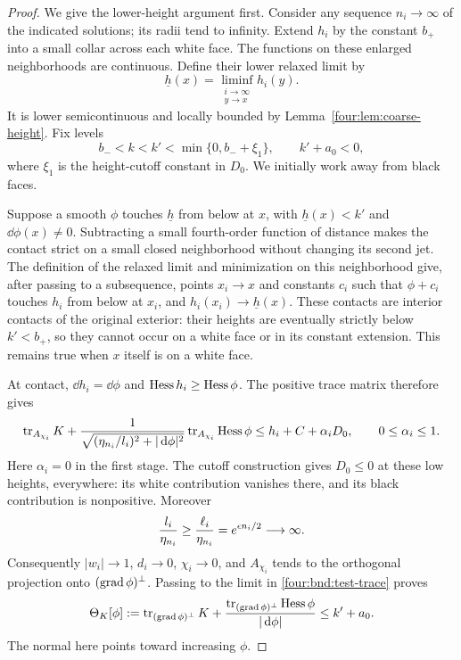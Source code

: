\begin{proof}
We give the lower-height argument first.  Consider any sequence
$n_i\to\infty$ of the indicated solutions; its radii tend to infinity.
Extend $h_i$ by the constant $b_+$ into a small collar across each white
face.  The functions on these enlarged neighborhoods are continuous.
Define their lower relaxed limit by
\[
 \underline h(x)=\liminf_{\substack{i\to\infty\\y\to x}}h_i(y).
\]
It is lower semicontinuous and locally bounded by
Lemma~\ref{four:lem:coarse-height}.  Fix levels
\begin{equation}\label{four:bnd:levels}
 b_-<k<k'<\min\{0,b_-+\xi_1\},\qquad k'+a_0<0,
\end{equation}
where $\xi_1$ is the height-cutoff constant in $D_0$.
We initially work away from black faces.

Suppose a smooth $\phi$ touches $\underline h$ from below at $x$,
with $\underline h(x)<k'$ and $\dd\phi(x)\ne0$.  Subtracting a small
fourth-order function of distance makes the contact strict on a
small closed neighborhood without changing its second jet.  The
definition of the relaxed limit and minimization on this neighborhood
give, after passing to a subsequence, points $x_i\to x$ and constants $c_i$ such that $\phi+c_i$
touches $h_i$ from below at $x_i$, and
$h_i(x_i)\to\underline h(x)$.  These contacts are interior contacts of
the original exterior: their heights are eventually strictly below
$k'<b_+$, so they cannot occur on a white face or in its constant
extension.  This remains true when $x$ itself is on a white face.

At contact, $\dd h_i=\dd\phi$ and
$\operatorname{Hess} h_i\ge\operatorname{Hess}\phi$.  The positive trace matrix therefore gives
\begin{equation}\label{four:bnd:test-trace}
 \operatorname{tr}_{A_{\chi_i}}K+
 \frac{1}{\sqrt{(\eta_{n_i}/l_i)^2+|\,\mathrm d\phi|^2}}
       \operatorname{tr}_{A_{\chi_i}}\operatorname{Hess}\phi
 \le h_i+C+\alpha_iD_0,
 \qquad 0\le\alpha_i\le1.
\end{equation}
Here $\alpha_i=0$ in the first stage.  The cutoff construction gives
$D_0\le0$ at these low heights, everywhere: its white contribution
vanishes there, and its black contribution is nonpositive.  Moreover
\[
 \frac{l_i}{\eta_{n_i}}\ge
 \frac{\ell_i}{\eta_{n_i}}=e^{\epsilon n_i/2}\longrightarrow\infty.
\]
Consequently $|w_i|\to1$, $d_i\to0$, $\chi_i\to0$,
and $A_{\chi_i}$ tends to the orthogonal projection onto
$(\operatorname{grad}\phi)^\perp$.  Passing to the
limit in \eqref{four:bnd:test-trace} proves
\begin{equation}\label{four:bnd:limiting-expansion}
 \Theta_K[\phi]:=
 \operatorname{tr}_{(\operatorname{grad}\phi)^\perp}K+
 \frac{\operatorname{tr}_{(\operatorname{grad}\phi)^\perp}\operatorname{Hess}\phi}{|\,\mathrm d\phi|}
 \le k'+a_0.
\end{equation}
The normal here points toward increasing $\phi$.


\end{proof}
